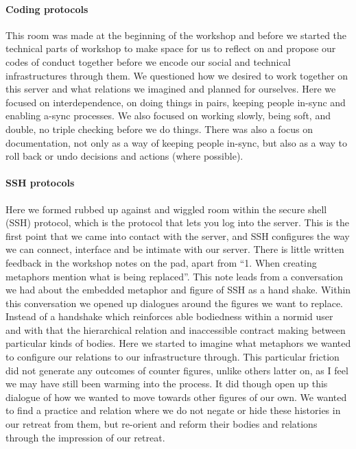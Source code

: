 \hypertarget{coding-protocols}{%
\paragraph[Coding
protocols]{\texorpdfstring{\protect\hypertarget{anchor}{}{}Coding
protocols}{Coding protocols}}\label{coding-protocols}}

This room was made at the beginning of the workshop and before we
started the technical parts of workshop to make space for us to reflect
on and propose our codes of conduct together before we encode our social
and technical infrastructures through them. We questioned how we desired
to work together on this server and what relations we imagined and
planned for ourselves. Here we focused on interdependence, on doing
things in pairs, keeping people in-sync and enabling a-sync processes.
We also focused on working slowly, being soft, and double, no triple
checking before we do things. There was also a focus on documentation,
not only as a way of keeping people in-sync, but also as a way to roll
back or undo decisions and actions (where possible).

\hypertarget{ssh-protocols}{%
\paragraph[SSH
protocols]{\texorpdfstring{\protect\hypertarget{anchor}{}{}SSH
protocols}{SSH protocols}}\label{ssh-protocols}}

Here we formed rubbed up against and wiggled room within the secure
shell (SSH) protocol, which is the protocol that lets you log into the
server. This is the first point that we came into contact with the
server, and SSH configures the way we can connect, interface and be
intimate with our server. There is little written feedback in the
workshop notes on the pad, apart from ``1. When creating metaphors
mention what is being replaced''. This note leads from a conversation we
had about the embedded metaphor and figure of SSH as a hand shake.
Within this conversation we opened up dialogues around the figures we
want to replace. Instead of a handshake which reinforces able bodiedness
within a normid user and with that the hierarchical relation and
inaccessible contract making between particular kinds of bodies. Here we
started to imagine what metaphors we wanted to configure our relations
to our infrastructure through. This particular friction did not generate
any outcomes of counter figures, unlike others latter on, as I feel we
may have still been warming into the process. It did though open up this
dialogue of how we wanted to move towards other figures of our own. We
wanted to find a practice and relation where we do not negate or hide
these histories in our retreat from them, but re-orient and reform their
bodies and relations through the impression of our retreat.

